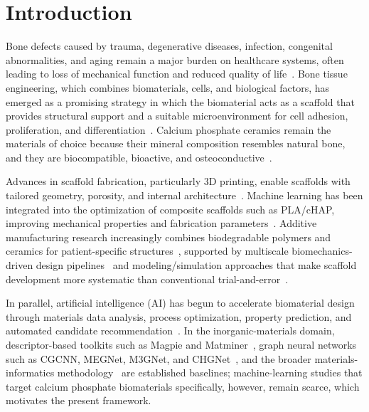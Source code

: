 \documentclass[review,11pt,a4paper]{elsarticle}
\begin{document}
\section{Introduction}

Bone defects caused by trauma, degenerative diseases, infection, congenital abnormalities, and aging remain a major burden on healthcare systems, often leading to loss of mechanical function and reduced quality of life~\cite{farag2023}. Bone tissue engineering, which combines biomaterials, cells, and biological factors, has emerged as a promising strategy in which the biomaterial acts as a scaffold that provides structural support and a suitable microenvironment for cell adhesion, proliferation, and differentiation~\cite{farag2023}. Calcium phosphate ceramics remain the materials of choice because their mineral composition resembles natural bone, and they are biocompatible, bioactive, and osteoconductive~\cite{vaiani2023}.

Advances in scaffold fabrication, particularly 3D printing, enable scaffolds with tailored geometry, porosity, and internal architecture~\cite{premananth2024}. Machine learning has been integrated into the optimization of composite scaffolds such as PLA/cHAP, improving mechanical properties and fabrication parameters~\cite{omigbodun2024}. Additive manufacturing research increasingly combines biodegradable polymers and ceramics for patient-specific structures~\cite{zhu2025}, supported by multiscale biomechanics-driven design pipelines~\cite{hou2026} and modeling/simulation approaches that make scaffold development more systematic than conventional trial-and-error~\cite{vasudev2026}.

In parallel, artificial intelligence (AI) has begun to accelerate biomaterial design through materials data analysis, process optimization, property prediction, and automated candidate recommendation~\cite{martelli2025,logeshwaran2024,gokcekuyu2024}. In the inorganic-materials domain, descriptor-based toolkits such as Magpie and Matminer~\cite{ward2016,ward2018}, graph neural networks such as CGCNN, MEGNet, M3GNet, and CHGNet~\cite{xie2018,chen2019,chen2022,deng2023}, and the broader materials-informatics methodology~\cite{ramprasad2017,schmidt2019} are established baselines; machine-learning studies that target calcium phosphate biomaterials specifically, however, remain scarce, which motivates the present framework.
\end{document}
